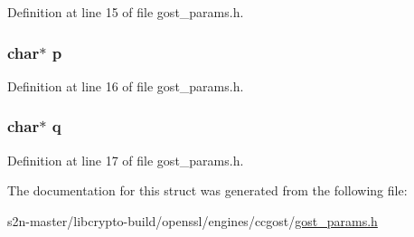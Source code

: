 Definition at line 15 of file gost\+\_\+params.\+h.

\subsubsection[{\texorpdfstring{p}{p}}]{\setlength{\rightskip}{0pt plus 5cm}char$\ast$ p}\hypertarget{struct_r3410_aaa1ebe818ec1c763a776cc580551f3e6}{}\label{struct_r3410_aaa1ebe818ec1c763a776cc580551f3e6}


Definition at line 16 of file gost\+\_\+params.\+h.

\subsubsection[{\texorpdfstring{q}{q}}]{\setlength{\rightskip}{0pt plus 5cm}char$\ast$ q}\hypertarget{struct_r3410_a5d2b44119a969086f33b7b0e909c3cdc}{}\label{struct_r3410_a5d2b44119a969086f33b7b0e909c3cdc}


Definition at line 17 of file gost\+\_\+params.\+h.



The documentation for this struct was generated from the following file\+:\begin{DoxyCompactItemize}
\item 
s2n-\/master/libcrypto-\/build/openssl/engines/ccgost/\hyperlink{gost__params_8h}{gost\+\_\+params.\+h}\end{DoxyCompactItemize}
